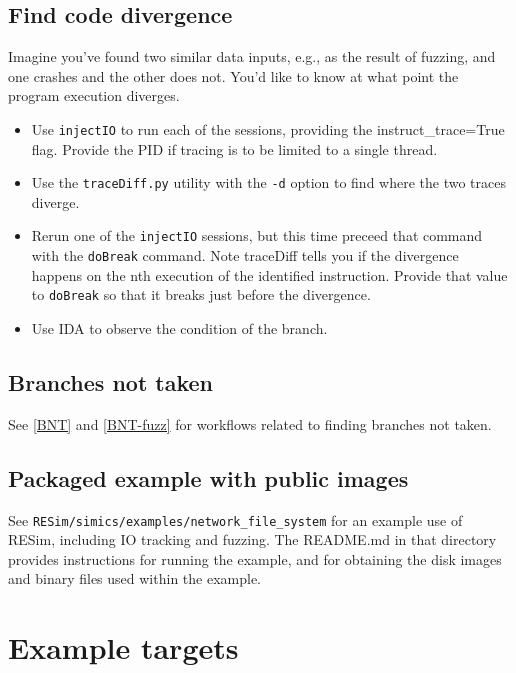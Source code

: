 \documentclass[titlepage]{article}
\begin{document}
\subsection{Find code divergence}
Imagine you've found two similar data inputs, e.g., as the result of fuzzing, and one
crashes and the other does not.  You'd like to know at what point the program execution diverges.
\begin{itemize}
\item Use {\tt injectIO} to run each of the sessions, providing the instruct\_trace=True flag.  Provide the PID if
tracing is to be limited to a single thread.
\item Use the {\tt traceDiff.py} utility with the {\tt -d} option to find where the two traces diverge.
\item Rerun one of the {\tt injectIO} sessions, but this time preceed that command with the {\tt doBreak} command.
Note traceDiff tells you if the divergence happens on the nth execution of the identified instruction.  Provide that
value to {\tt doBreak} so that it breaks just before the divergence.
\item Use IDA to observe the condition of the branch.
\end{itemize}

\subsection{Branches not taken}
See \ref{BNT} and \ref{BNT-fuzz} for workflows related to finding branches not taken.

\subsection{Packaged example with public images}
See {\tt RESim/simics/examples/network\_file\_system} for an example use of RESim, including IO tracking and fuzzing.
The README.md in that directory provides instructions for running the example, and for obtaining the disk images
and binary files used within the example.

\section{Example targets}
\label{example-targets}
\end{document}
